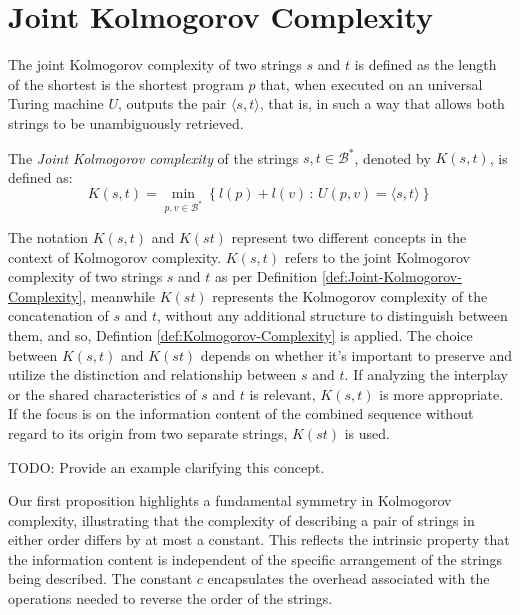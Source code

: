 %
%

\section{Joint Kolmogorov Complexity}

The joint Kolmogorov complexity of two strings $s$ and $t$ is defined as the length of the shortest is the shortest program $p$ that, when executed on an universal Turing machine $U$, outputs the pair $\langle s, t \rangle$, that is, in such a way that allows both strings to be unambiguously retrieved.

\begin{definition}
\label{def:Joint-Kolmogorov-Complexity}
The \emph{Joint Kolmogorov complexity} of the strings $s, t \in \mathcal{B}^\ast$, denoted by $K(s, t)$, is defined as:
\[
K(s, t)=\min_{p,v \in \mathcal{B}^\ast}\left\{l(p) + l(v)\,:\, U(p,v)=\langle s, t \rangle \right\}
\]
\end{definition}

The notation $K(s, t)$ and $K(st)$ represent two different concepts in the context of Kolmogorov complexity. $K(s, t)$ refers to the joint Kolmogorov complexity of two strings $s$ and $t$ as per Definition \ref{def:Joint-Kolmogorov-Complexity}, meanwhile $K(st)$ represents the Kolmogorov complexity of the concatenation of $s$ and $t$, without any additional structure to distinguish between them, and so, Defintion \ref{def:Kolmogorov-Complexity} is applied. The choice between $K(s, t)$ and $K(st)$ depends on whether it's important to preserve and utilize the distinction and relationship between $s$ and $t$. If analyzing the interplay or the shared characteristics of $s$ and $t$ is relevant, $K(s, t)$ is more appropriate. If the focus is on the information content of the combined sequence without regard to its origin from two separate strings, $K(st)$ is used.

\begin{example}
{\color{red} TODO: Provide an example clarifying this concept.}
\end{example}

Our first proposition highlights a fundamental symmetry in Kolmogorov complexity, illustrating that the complexity of describing a pair of strings in either order differs by at most a constant. This reflects the intrinsic property that the information content is independent of the specific arrangement of the strings being described. The constant \(c\) encapsulates the overhead associated with the operations needed to reverse the order of the strings.


